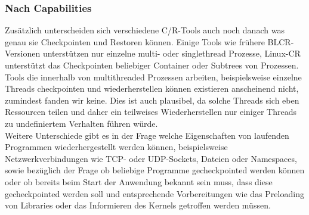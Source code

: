 \documentclass[a4paper]{article}
\begin{document}
\subsubsection{Nach Capabilities}
Zusätzlich unterscheiden sich verschiedene C/R-Tools auch noch danach was genau sie Checkpointen und Restoren können. Einige Tools wie frühere BLCR-Versionen unterstützen nur einzelne multi- oder singlethread Prozesse, Linux-CR unterstützt das Checkpointen beliebiger Container oder Subtrees von Prozessen. Tools die innerhalb von multithreaded Prozessen arbeiten, beispielsweise einzelne Threads checkpointen und wiederherstellen können existieren anscheinend nicht, zumindest fanden wir keine. Dies ist auch plausibel, da solche Threads sich eben Ressourcen teilen und daher ein teilweises Wiederherstellen nur einiger Threads zu undefiniertem Verhalten führen würde.\\
Weitere Unterschiede gibt es in der Frage welche Eigenschaften von laufenden Programmen wiederhergestellt werden können, beispielsweise Netzwerkverbindungen wie TCP- oder UDP-Sockets, Dateien oder Namespaces, sowie bezüglich der Frage ob beliebige Programme gecheckpointed werden können oder ob bereits beim Start der Anwendung bekannt sein muss, dass diese gecheckpointed werden soll und entsprechende Vorbereitungen wie das Preloading von Libraries oder das Informieren des Kernels getroffen werden müssen.
\end{document}
